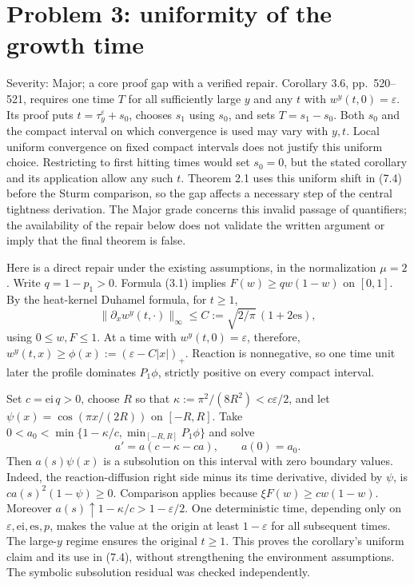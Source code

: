 \documentclass[10pt]{article}
\begin{document}
\section*{Problem 3: uniformity of the growth time}
Severity: Major; a core proof gap with a verified repair. Corollary 3.6, pp. 520–521, requires one time \(T\) for all sufficiently large \(y\) and any \(t\) with \(w^y(t,0)=\varepsilon\). Its proof puts \(t=\tau_y^\varepsilon+s_0\), chooses \(s_1\) using \(s_0\), and sets \(T=s_1-s_0\). Both \(s_0\) and the compact interval on which convergence is used may vary with \(y,t\). Local uniform convergence on fixed compact intervals does not justify this uniform choice. Restricting to first hitting times would set \(s_0=0\), but the stated corollary and its application allow any such \(t\). Theorem 2.1 uses this uniform shift in (7.4) before the Sturm comparison, so the gap affects a necessary step of the central tightness derivation. The Major grade concerns this invalid passage of quantifiers; the availability of the repair below does not validate the written argument or imply that the final theorem is false.\par
Here is a direct repair under the existing assumptions, in the normalization \(\mu=2\). Write \(q=1-p_1>0\). Formula (3.1) implies \(F(w)\ge q w(1-w)\) on \([0,1]\). By the heat-kernel Duhamel formula, for \(t\ge1\), \[\|\partial_xw^y(t,\cdot)\|_\infty
\le C:=\sqrt{2/\pi}\,(1+2\mathrm{es}),\] using \(0\le w,F\le1\). At a time with \(w^y(t,0)=\varepsilon\), therefore, \(w^y(t,x)\ge\phi(x):=(\varepsilon-C|x|)_+\). Reaction is nonnegative, so one time unit later the profile dominates \(P_1\phi\), strictly positive on every compact interval.\par
Set \(c=\mathrm{ei}\,q>0\), choose \(R\) so that \(\kappa:=\pi^2/(8R^2)<c\varepsilon/2\), and let \(\psi(x)=\cos(\pi x/(2R))\) on \([-R,R]\). Take \(0<a_0<\min\{1-\kappa/c,\min_{[-R,R]}P_1\phi\}\) and solve \[a'=a(c-\kappa-ca),\qquad a(0)=a_0.\] Then \(a(s)\psi(x)\) is a subsolution on this interval with zero boundary values. Indeed, the reaction-diffusion right side minus its time derivative, divided by \(\psi\), is \(ca(s)^2(1-\psi)\ge0\). Comparison applies because \(\xi F(w)\ge c w(1-w)\). Moreover \(a(s)\uparrow1-\kappa/c>1-\varepsilon/2\). One deterministic time, depending only on \(\varepsilon,\mathrm{ei},\mathrm{es},p\), makes the value at the origin at least \(1-\varepsilon\) for all subsequent times. The large-\(y\) regime ensures the original \(t\ge1\). This proves the corollary’s uniform claim and its use in (7.4), without strengthening the environment assumptions. The symbolic subsolution residual was checked independently.\par
\end{document}
